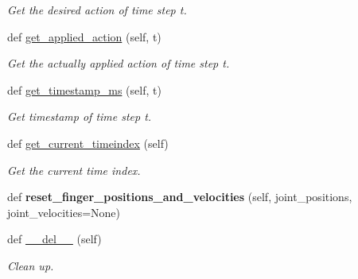 \begin{DoxyCompactItemize}
\begin{DoxyCompactList}\small\item\em Get the desired action of time step \textquotesingle{}t\textquotesingle{}. \end{DoxyCompactList}\item 
def \hyperlink{classtrifinger__simulation_1_1sim__finger_1_1SimFinger_a1aa1717c3ea9c3d78659360e64246544}{get\+\_\+applied\+\_\+action} (self, t)
\begin{DoxyCompactList}\small\item\em Get the actually applied action of time step \textquotesingle{}t\textquotesingle{}. \end{DoxyCompactList}\item 
def \hyperlink{classtrifinger__simulation_1_1sim__finger_1_1SimFinger_a7836fb9b5deacefa636afcea7b9639d7}{get\+\_\+timestamp\+\_\+ms} (self, t)
\begin{DoxyCompactList}\small\item\em Get timestamp of time step \textquotesingle{}t\textquotesingle{}. \end{DoxyCompactList}\item 
def \hyperlink{classtrifinger__simulation_1_1sim__finger_1_1SimFinger_a26ba218495f7bb5c1615184070100df5}{get\+\_\+current\+\_\+timeindex} (self)
\begin{DoxyCompactList}\small\item\em Get the current time index. \end{DoxyCompactList}\item 
\mbox{\label{classtrifinger__simulation_1_1sim__finger_1_1SimFinger_a791e4675bdcbb97ecdfb7e27c407e603}} 
def {\bfseries reset\+\_\+finger\+\_\+positions\+\_\+and\+\_\+velocities} (self, joint\+\_\+positions, joint\+\_\+velocities=None)
\item 
def \hyperlink{classtrifinger__simulation_1_1sim__finger_1_1SimFinger_acad7e2ed039c444081cb287d7ba33428}{\+\_\+\+\_\+del\+\_\+\+\_\+} (self)
\begin{DoxyCompactList}\small\item\em Clean up. \end{DoxyCompactList}\end{DoxyCompactItemize}

